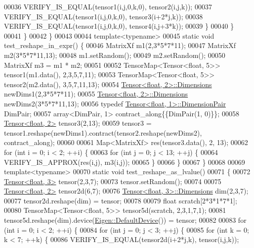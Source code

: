 \begin{DoxyCode}
00036         VERIFY\_IS\_EQUAL(tensor1(i,j,0,k,0), tensor2(i,j,k));
00037         VERIFY\_IS\_EQUAL(tensor1(i,j,0,k,0), tensor3(i+2*j,k));
00038         VERIFY\_IS\_EQUAL(tensor1(i,j,0,k,0), tensor4(i,j+3*k));
00039       \}
00040     \}
00041   \}
00042 \}
00043 
00044 \textcolor{keyword}{template}<\textcolor{keyword}{typename}>
00045 \textcolor{keyword}{static} \textcolor{keywordtype}{void} test\_reshape\_in\_expr() \{
00046   MatrixXf m1(2,3*5*7*11);
00047   MatrixXf m2(3*5*7*11,13);
00048   m1.setRandom();
00049   m2.setRandom();
00050   MatrixXf m3 = m1 * m2;
00051 
00052   TensorMap<Tensor<float, 5>> tensor1(m1.data(), 2,3,5,7,11);
00053   TensorMap<Tensor<float, 5>> tensor2(m2.data(), 3,5,7,11,13);
00054   \hyperlink{class_eigen_1_1_tensor}{Tensor<float, 2>::Dimensions} newDims1(2,3*5*7*11);
00055   \hyperlink{class_eigen_1_1_tensor}{Tensor<float, 2>::Dimensions} newDims2(3*5*7*11,13);
00056   \textcolor{keyword}{typedef} \hyperlink{class_eigen_1_1_tensor}{Tensor<float, 1>::DimensionPair} DimPair;
00057   array<DimPair, 1> contract\_along\{\{DimPair(1, 0)\}\};
00058   \hyperlink{class_eigen_1_1_tensor}{Tensor<float, 2>} tensor3(2,13);
00059   tensor3 = tensor1.reshape(newDims1).contract(tensor2.reshape(newDims2), contract\_along);
00060 
00061   Map<MatrixXf> res(tensor3.data(), 2, 13);
00062   \textcolor{keywordflow}{for} (\textcolor{keywordtype}{int} i = 0; i < 2; ++i) \{
00063     \textcolor{keywordflow}{for} (\textcolor{keywordtype}{int} j = 0; j < 13; ++j) \{
00064       VERIFY\_IS\_APPROX(res(i,j), m3(i,j));
00065     \}
00066   \}
00067 \}
00068 
00069 \textcolor{keyword}{template}<\textcolor{keyword}{typename}>
00070 \textcolor{keyword}{static} \textcolor{keywordtype}{void} test\_reshape\_as\_lvalue()
00071 \{
00072   \hyperlink{class_eigen_1_1_tensor}{Tensor<float, 3>} tensor(2,3,7);
00073   tensor.setRandom();
00074 
00075   \hyperlink{class_eigen_1_1_tensor}{Tensor<float, 2>} tensor2d(6,7);
00076   \hyperlink{class_eigen_1_1_tensor}{Tensor<float, 3>::Dimensions} dim(2,3,7);
00077   tensor2d.reshape(dim) = tensor;
00078 
00079   \textcolor{keywordtype}{float} scratch[2*3*1*7*1];
00080   TensorMap<Tensor<float, 5>> tensor5d(scratch, 2,3,1,7,1);
00081   tensor5d.reshape(dim).device(\hyperlink{struct_eigen_1_1_default_device}{Eigen::DefaultDevice}()) = tensor;
00082 
00083   \textcolor{keywordflow}{for} (\textcolor{keywordtype}{int} i = 0; i < 2; ++i) \{
00084     \textcolor{keywordflow}{for} (\textcolor{keywordtype}{int} j = 0; j < 3; ++j) \{
00085       \textcolor{keywordflow}{for} (\textcolor{keywordtype}{int} k = 0; k < 7; ++k) \{
00086         VERIFY\_IS\_EQUAL(tensor2d(i+2*j,k), tensor(i,j,k));

\end{DoxyCode}
